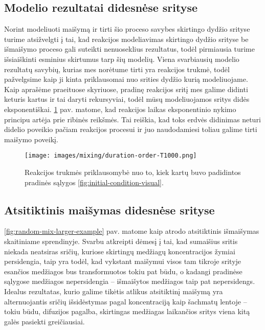 \subsection{Modelio rezultatai didesnėse srityse}
Norint modeliuoti maišymą ir tirti šio proceso savybes skirtingo dydžio srityse turime atsižvelgti į tai, kad reakcijos modeliavimas skirtingo dydžio srityse be išmaišymo proceso gali suteikti nenuoseklius rezultatus, todėl pirmiausia turime išsiaiškinti esminius skirtumus tarp šių modelių. Viena svarbiausių modelio rezultatų savybių, kurias mes norėtume tirti yra reakcijos trukmė, todėl pažvelgsime kaip ji kinta priklausomai nuo srities dydžio kurią modeliuojame. Kaip aprašėme praeituose skyriuose, pradinę reakcijos sritį mes galime didinti keturis kartus ir tai daryti rekursyviai, todėl mūsų modeliuojamos sritys didės eksponentiškai. \ref{fig:duration-order-dependance} pav. matome, kad reakcijos laikas eksponentinio nykimo principu artėja prie ribinės reikšmės. Tai reiškia, kad toks erdvės didinimas neturi didelio poveikio pačiam reakcijos procesui ir juo naudodamiesi toliau galime tirti maišymo poveikį.
\begin{figure}[h!]
    \centering
    \texttt{[image: images/mixing/duration-order-T1000.png]}

    \caption{Reakcijos trukmės priklausomybė nuo to, kiek kartų buvo padidintos pradinės sąlygos \eqref{fig:initial-condition-visual}. }

    \label{fig:duration-order-dependance}
\end{figure}
\subsection{Atsitiktinis maišymas didesnėse srityse}
\ref{fig:random-mix-larger-example} pav. matome kaip atrodo atsitiktinis išmaišymas skaitiniame sprendinyje. Svarbu atkreipti dėmesį į tai, kad sumaišius sritis niekada neatsiras sričių, kuriose skirtingų medžiagų koncentracijos žymiai persidengia, taip yra todėl, kad vykstant maišymui visos tam tikroje srityje esančios medžiagos bus transformuotos tokiu pat būdu, o kadangi pradinėse sąlygose medžiagos nepersidengia -- išmaišytos medžiagos taip pat nepersidengs. Idealus rezultatas, kurio galime tikėtis atlikus atsitiktinį maišymą yra alternuojantis sričių išsidėstymas pagal koncentraciją kaip šachmatų lentoje -- tokiu būdu, difuzijos pagalba, skirtingas medžiagas laikančios sritys viena kitą galės pasiekti greičiausiai.

\newpage

